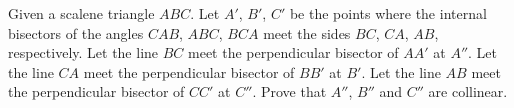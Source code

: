Given a scalene triangle $ ABC$. Let $ A'$,  $ B'$,  $ C'$ be the points where the internal bisectors of the angles $ CAB$,  $ ABC$,  $ BCA$ meet the sides $ BC$,  $ CA$,  $ AB$,  respectively. Let the line $ BC$ meet the perpendicular bisector of $ AA'$ at $ A''$. Let the line $ CA$ meet the perpendicular bisector of $ BB'$ at $ B'$. Let the line $ AB$ meet the perpendicular bisector of $ CC'$ at $ C''$. Prove that $ A''$,  $ B''$ and $ C''$ are collinear.